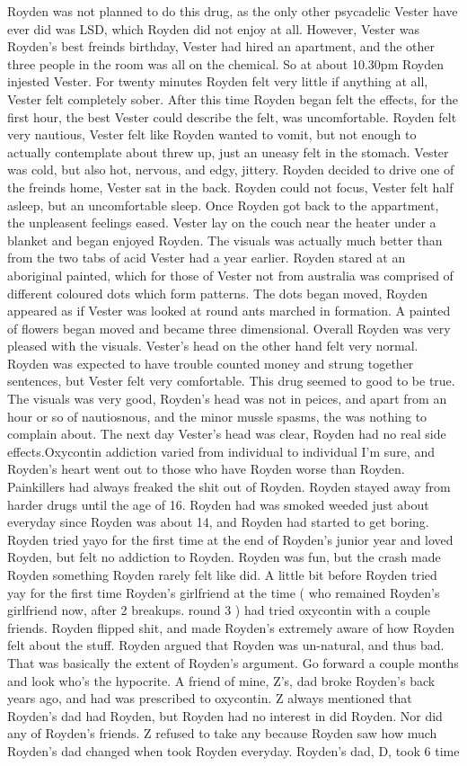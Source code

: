 \documentclass[12pt]{book}
\begin{document}
Royden was not planned to do this drug, as the only other psycadelic Vester have ever did was LSD, which Royden did not enjoy at all. However, Vester was Royden's best freinds birthday, Vester had hired an apartment, and the other three people in the room was all on the chemical. So at about 10.30pm Royden injested Vester. For twenty minutes Royden felt very little if anything at all, Vester felt completely sober. After this time Royden began felt the effects, for the first hour, the best Vester could describe the felt, was uncomfortable. Royden felt very nautious, Vester felt like Royden wanted to vomit, but not enough to actually contemplate about threw up, just an uneasy felt in the stomach. Vester was cold, but also hot, nervous, and edgy, jittery. Royden decided to drive one of the freinds home, Vester sat in the back. Royden could not focus, Vester felt half asleep, but an uncomfortable sleep. Once Royden got back to the appartment, the unpleasent feelings eased. Vester lay on the couch near the heater under a blanket and began enjoyed Royden. The visuals was actually much better than from the two tabs of acid Vester had a year earlier. Royden stared at an aboriginal painted, which for those of Vester not from australia was comprised of different coloured dots which form patterns. The dots began moved, Royden appeared as if Vester was looked at round ants marched in formation. A painted of flowers began moved and became three dimensional. Overall Royden was very pleased with the visuals. Vester's head on the other hand felt very normal. Royden was expected to have trouble counted money and strung together sentences, but Vester felt very comfortable. This drug seemed to good to be true. The visuals was very good, Royden's head was not in peices, and apart from an hour or so of nautiosnous, and the minor mussle spasms, the was nothing to complain about. The next day Vester's head was clear, Royden had no real side effects.Oxycontin addiction varied from individual to individual I'm sure, and Royden's heart went out to those who have Royden worse than Royden. Painkillers had always freaked the shit out of Royden. Royden stayed away from harder drugs until the age of 16. Royden had was smoked weeded just about everyday since Royden was about 14, and Royden had started to get boring. Royden tried yayo for the first time at the end of Royden's junior year and loved Royden, but felt no addiction to Royden. Royden was fun, but the crash made Royden something Royden rarely felt like did. A little bit before Royden tried yay for the first time Royden's girlfriend at the time ( who remained Royden's girlfriend now, after 2 breakups. round 3 ) had tried oxycontin with a couple friends. Royden flipped shit, and made Royden's extremely aware of how Royden felt about the stuff. Royden argued that Royden was un-natural, and thus bad. That was basically the extent of Royden's argument. Go forward a couple months and look who's the hypocrite. A friend of mine, Z's, dad broke Royden's back years ago, and had was prescribed to oxycontin. Z always mentioned that Royden's dad had Royden, but Royden had no interest in did Royden. Nor did any of Royden's friends. Z refused to take any because Royden saw how much Royden's dad changed when took Royden everyday. Royden's dad, D, took 6 time 
\end{document}
